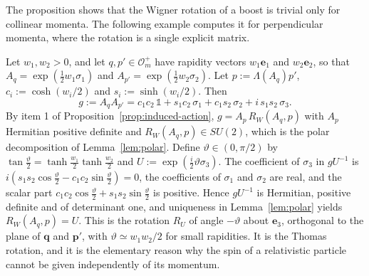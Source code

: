 The proposition shows that the Wigner rotation of a boost is trivial only for collinear momenta. The following example computes it for perpendicular momenta, where the rotation is a single explicit matrix.

\begin{example}\label{ex:thomas-wigner}
	Let $w_1,w_2>0$, and let $q,p'\in\mathcal{O}_m^+$ have rapidity vectors $w_1\mathbf{e}_1$ and $w_2\mathbf{e}_2$, so that $A_q=\exp(\tfrac12w_1\sigma_1)$ and $A_{p'}=\exp(\tfrac12w_2\sigma_2)$. Let $p:=\Lambda(A_q)p'$, $c_i:=\cosh(w_i/2)$ and $s_i:=\sinh(w_i/2)$. Then
	\begin{equation*}
		g:=A_qA_{p'}=c_1c_2\,\mathbb{1}+s_1c_2\,\sigma_1+c_1s_2\,\sigma_2+i\,s_1s_2\,\sigma_3.
	\end{equation*}
	By item 1 of Proposition~\ref{prop:induced-action}, $g=A_p\,R_W(A_q,p)$ with $A_p$ Hermitian positive definite and $R_W(A_q,p)\in SU(2)$, which is the polar decomposition of Lemma~\ref{lem:polar}. Define $\vartheta\in(0,\pi/2)$ by $\tan\tfrac\vartheta2=\tanh\tfrac{w_1}{2}\tanh\tfrac{w_2}{2}$ and $U:=\exp(\tfrac i2\vartheta\sigma_3)$. The coefficient of $\sigma_3$ in $gU^{-1}$ is $i(s_1s_2\cos\tfrac\vartheta2-c_1c_2\sin\tfrac\vartheta2)=0$, the coefficients of $\sigma_1$ and $\sigma_2$ are real, and the scalar part $c_1c_2\cos\tfrac\vartheta2+s_1s_2\sin\tfrac\vartheta2$ is positive. Hence $gU^{-1}$ is Hermitian, positive definite and of determinant one, and uniqueness in Lemma~\ref{lem:polar} yields $R_W(A_q,p)=U$. This is the rotation $R_U$ of angle $-\vartheta$ about $\mathbf{e}_3$, orthogonal to the plane of $\mathbf{q}$ and $\mathbf{p}'$, with $\vartheta\simeq w_1w_2/2$ for small rapidities. It is the Thomas rotation, and it is the elementary reason why the spin of a relativistic particle cannot be given independently of its momentum.
\end{example}

